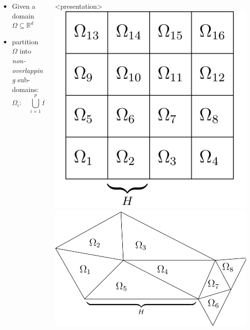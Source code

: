 \documentclass[aspectratio=169,11pt]{beamer}
\theoremstyle{definition}
\begin{document}
\begin{frame}
\begin{columns}
\begin{column}{0.6\linewidth}
      \begin{itemize}
      \item Given a domain $\Omega\subseteq\mathbb{R}^d$
      \item partition $\Omega$ into \emph{non-overlapping}
        sub-domains:
        \[
        \Omega_i\colon\quad \bigcup_{i=1}^p \overline{\Omega}_i = \overline{\Omega}, \quad
        \Omega_i\cap\Omega_j=\emptyset \;\forall i\ne j.
        \]
      \end{itemize}
    \end{column}
    \begin{column}{0.4\linewidth}
      \begin{onlyenv}<presentation>
        \includegraphics[width=0.6\linewidth]{konstr_n_uberl_str}
        \vskip5mm
        \includegraphics[width=0.9\linewidth]{konstr_n_uberl_unstr}
      \end{onlyenv}

\end{column}
\end{columns}
\end{frame}
\end{document}
